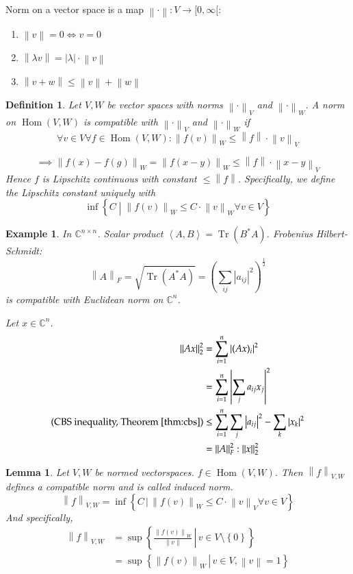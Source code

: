 \documentclass{article}
\newtheorem{example}{Example}  \numberwithin{example}{section}
\newtheorem{definition}{Definition}  \numberwithin{definition}{section}
\newtheorem{lemma}{Lemma}  \numberwithin{lemma}{section}
\newcommand{\set}[1]{\left\{#1\right\}}
\newcommand{\setdef}[2]{\left\{\left.#1\,\right|\,#2\right\}}
\newcommand{\angel}[1]{\left\langle#1\right\rangle}
\newcommand{\norm}[1]{\left\|#1\right\|}
\newcommand{\card}[1]{\left|#1\right|}
\begin{document}
Norm on a vector space is a map $\norm{\cdot}: V \to [0, \infty[$:
\begin{enumerate}
  \item $\norm{v} = 0 \iff v = 0$
  \item $\norm{\lambda v} = \card{\lambda} \cdot \norm{v}$
  \item $\norm{v + w} \leq \norm{v} + \norm{w}$
\end{enumerate}

\begin{definition} %
  Let $V, W$ be vector spaces with norms $\norm{\cdot}_V$ and $\norm{\cdot}_W$.
  A norm on $\operatorname{Hom}(V, W)$ is \emph{compatible} with $\norm{\cdot}_V$ and $\norm{\cdot}_W$ if
  \[ \forall v \in V \forall f \in \operatorname{Hom}(V, W): \norm{f(v)}_W \leq \norm{f} \cdot \norm{v}_V \]

  \[ \implies \norm{f(x) - f(g)}_W = \norm{f(x - y)}_W \leq \norm{f} \cdot \norm{x - y}_V \]
  Hence $f$ is Lipschitz continuous with constant $\leq \norm{f}$.
  Specifically, we define the Lipschitz constant uniquely with
  \[ \inf\set{C \middle| \norm{f(v)}_W \leq C \cdot \norm{v}_W \forall v \in V} \]
\end{definition}

\begin{example}
  In $\mathbb C^{n \times n}$. Scalar product $\angel{A, B} = \operatorname{Tr}(B^* A)$.
  Frobenius Hilbert-Schmidt:
  \[ \norm{A}_F = \sqrt{\operatorname{Tr}(A^* A)} = \left(\sum_{ij} \card{a_{ij}}^2\right)^{\frac12} \]
  is compatible with Euclidean norm on $\mathbb C^n$.

  Let $x \in \mathbb C^n$.
  \begin{align*}
    \norm{Ax}_2^2 &= \sum_{i=1}^n \card{(Ax)_i}^2 \\
      &= \sum_{i=1}^n \card{\sum_j a_{ij} x_j}^2 \\
    \text{(CBS inequality, Theorem~\ref{thm:cbs})} &\leq \sum_{i=1}^n \sum_j \card{a_{ij}}^2 - \sum_k \card{x_k}^2 \\
      &= \norm{A}_F^2 : \norm{x}_2^2
  \end{align*}
\end{example}

\begin{lemma} %
  Let $V, W$ be normed vectorspaces. $f \in \operatorname{Hom}(V, W)$.
  Then $\norm{f}_{V, W}$ defines a compatible norm and is called \emph{induced norm}.
  \[ \norm{f}_{V,W} = \inf\setdef{C}{\norm{f(v)}_W \leq C \cdot \norm{v}_V \forall v \in V} \]
  And specifically,
  \begin{align*}
    \norm{f}_{V,W} &= \sup\setdef{\frac{\norm{f(v)}_W}{\norm{v}}}{v \in V \setminus \set{0}} \\
      &= \sup\setdef{\norm{f(v)}_W}{v \in V, \norm{v} = 1} \\
  \end{align*}
\end{lemma}
\end{document}
